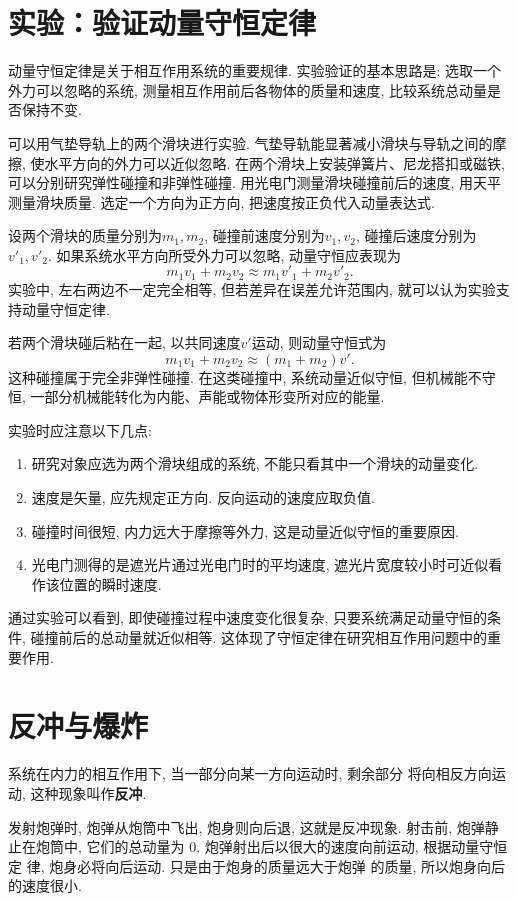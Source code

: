 \documentclass[11pt,a4paper]{ctexbook}
\begin{document}
\section{实验：验证动量守恒定律}

动量守恒定律是关于相互作用系统的重要规律. 实验验证的基本思路是: 选取一个外力可以忽略的系统,
测量相互作用前后各物体的质量和速度, 比较系统总动量是否保持不变.

可以用气垫导轨上的两个滑块进行实验. 气垫导轨能显著减小滑块与导轨之间的摩擦, 使水平方向的外力可以近似忽略.
在两个滑块上安装弹簧片、尼龙搭扣或磁铁, 可以分别研究弹性碰撞和非弹性碰撞. 用光电门测量滑块碰撞前后的速度,
用天平测量滑块质量. 选定一个方向为正方向, 把速度按正负代入动量表达式.

设两个滑块的质量分别为$m_1,m_2$, 碰撞前速度分别为$v_1,v_2$, 碰撞后速度分别为$v'_1,v'_2$.
如果系统水平方向所受外力可以忽略, 动量守恒应表现为
$$m_1v_1+m_2v_2\approx m_1v'_1+m_2v'_2.$$
实验中, 左右两边不一定完全相等, 但若差异在误差允许范围内, 就可以认为实验支持动量守恒定律.

若两个滑块碰后粘在一起, 以共同速度$v'$运动, 则动量守恒式为
$$m_1v_1+m_2v_2\approx (m_1+m_2)v'.$$
这种碰撞属于完全非弹性碰撞. 在这类碰撞中, 系统动量近似守恒, 但机械能不守恒,
一部分机械能转化为内能、声能或物体形变所对应的能量.

实验时应注意以下几点:
\begin{enumerate}
    \item 研究对象应选为两个滑块组成的系统, 不能只看其中一个滑块的动量变化.
    \item 速度是矢量, 应先规定正方向. 反向运动的速度应取负值.
    \item 碰撞时间很短, 内力远大于摩擦等外力, 这是动量近似守恒的重要原因.
    \item 光电门测得的是遮光片通过光电门时的平均速度, 遮光片宽度较小时可近似看作该位置的瞬时速度.
\end{enumerate}

通过实验可以看到, 即使碰撞过程中速度变化很复杂, 只要系统满足动量守恒的条件,
碰撞前后的总动量就近似相等. 这体现了守恒定律在研究相互作用问题中的重要作用.

\section{反冲与爆炸}
系统在内力的相互作用下, 当一部分向某一方向运动时, 剩余部分
将向相反方向运动, 这种现象叫作\textbf{反冲}.

发射炮弹时, 炮弹从炮筒中飞出, 炮身则向后退,
这就是反冲现象. 射击前, 炮弹静止在炮筒中, 它们的总动量为
0. 炮弹射出后以很大的速度向前运动, 根据动量守恒定
律, 炮身必将向后运动. 只是由于炮身的质量远大于炮弹
的质量, 所以炮身向后的速度很小.
\end{document}
